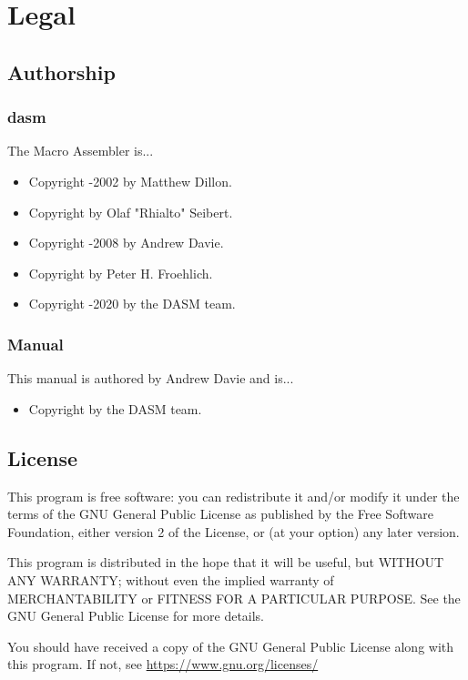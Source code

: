  
\chapter{Legal}


\section{Authorship}
\subsection{dasm}

The \dasm Macro Assembler is...

\begin{itemize}
\item Copyright -2002 by Matthew Dillon.
\item Copyright  by Olaf "Rhialto" Seibert.
\item Copyright -2008 by Andrew Davie.
\item Copyright  by Peter H. Froehlich.
\item Copyright -2020 by the DASM team.
\end{itemize}

\subsection{Manual}
This manual is authored by Andrew Davie and is...

\begin{itemize}
\item Copyright  by the DASM team.
\end{itemize}

\pagebreak
\label{changelog:20200824license}
\section{License}

This program is free software: you can redistribute it and/or modify
it under the terms of the GNU General Public License as published by
the Free Software Foundation, either version 2 of the License, or
(at your option) any later version.

This program is distributed in the hope that it will be useful,
but WITHOUT ANY WARRANTY; without even the implied warranty of
MERCHANTABILITY or FITNESS FOR A PARTICULAR PURPOSE.  See the
GNU General Public License for more details.

You should have received a copy of the GNU General Public License
along with this program.  If not, see \url{https://www.gnu.org/licenses/}

